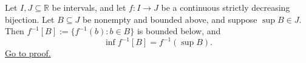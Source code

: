 \begin{theorem}
\label{thm:decreasing-inverse-supremum-to-infimum}
Let $I,J\subseteq\mathbb{R}$ be intervals, and let $f\colon I\to J$ be a continuous
strictly decreasing bijection.  Let $B\subseteq J$ be nonempty and bounded
above, and suppose $\sup B\in J$.  Then
$f^{-1}[B]:=\{f^{-1}(b):b\in B\}$ is bounded below, and
\[
  \inf f^{-1}[B]=f^{-1}(\sup B).
\]
\hyperref[prf:decreasing-inverse-supremum-to-infimum]{Go to proof.}
\end{theorem}